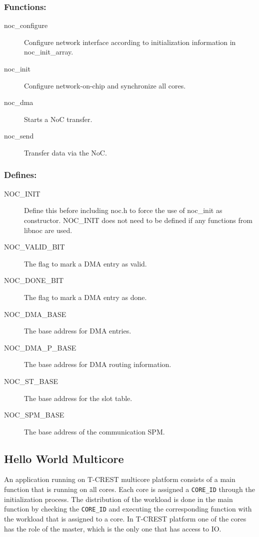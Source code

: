 \documentclass[a4paper,fontsize=10pt,twoside,DIV15,BCOR12mm,headinclude=true,footinclude=false,pagesize,bibtotoc]{scrbook}
\newcommand{\code}[1]{{\texttt{#1}}}
\begin{document}
\subsubsection{Functions:}
\begin{description}
\item [noc\_configure] Configure network interface according to initialization information in noc\_init\_array.
\item [noc\_init] Configure network-on-chip and synchronize all cores. 
\item [noc\_dma] Starts a NoC transfer. 
\item [noc\_send] Transfer data via the NoC. 
\end{description}

\subsubsection{Defines:}
\begin{description}
\item [NOC\_INIT] Define this before including noc.h to force the use of noc\_init as constructor. NOC\_INIT does not need to be defined if any functions from libnoc are used.
\item [NOC\_VALID\_BIT] The flag to mark a DMA entry as valid.
\item [NOC\_DONE\_BIT] The flag to mark a DMA entry as done.
\item [NOC\_DMA\_BASE] The base address for DMA entries.
\item [NOC\_DMA\_P\_BASE] The base address for DMA routing information.
\item [NOC\_ST\_BASE] The base address for the slot table.
\item [NOC\_SPM\_BASE] The base address of the communication SPM.
\end{description}

\subsection{Hello World Multicore}

An application running on T-CREST multicore platform consists of a main function that is running on all cores.
Each core is assigned a \code{CORE\_ID} through the initialization process. The distribution of the workload is done
in the main function by checking the \code{CORE\_ID} and executing the corresponding function with the workload that is assigned to a core.
In T-CREST platform one of the cores has the role of the master, which is the only one that has access to IO.
\end{document}
